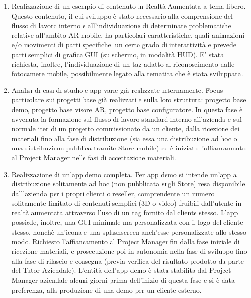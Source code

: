 \begin{enumerate}
	\item	Realizzazione di un esempio di contenuto in Realtà Aumentata a tema libero. Questo contenuto, il cui sviluppo è stato necessario alla comprensione del flusso di lavoro interno e all'individuazione di determinate problematiche relative all’ambito AR mobile, ha particolari caratteristiche, quali animazioni e/o movimenti di parti specifiche, un certo grado di interattività e prevede parti semplici di grafica GUI (su schermo, in modalità HUD). E' stata richiesta, inoltre, l’individuazione di un tag adatto al riconoscimento dalle fotocamere mobile, possibilmente legato alla tematica che \`e stata sviluppata.
	\item	Analisi di casi di studio e app varie già realizzate internamente. Focus particolare sui progetti base già realizzati e sulla loro struttura: progetto base demo, progetto base visore AR, progetto base configuratore. In questa fase \`e avvenuta la formazione sul flusso di lavoro standard interno all’azienda e sul normale iter di un progetto commissionato da un cliente, dalla ricezione dei materiali fino alla fase di distribuzione (sia essa una distribuzione ad hoc o una distribuzione pubblica tramite Store mobile) ed \`e iniziato l'affiancamento al Project Manager nelle fasi di accettazione materiali. 
	\item	Realizzazione di un’app demo completa. Per app demo si intende un’app a distribuzione solitamente ad hoc (non pubblicata sugli Store) resa disponibile dall’azienda per i propri clienti o reseller, comprendente un numero solitamente limitato di contenuti semplici (3D o video) fruibili dall’utente in realtà aumentata attraverso l’uso di un tag fornito dal cliente stesso. L’app possiede, inoltre, una GUI minimale ma personalizzata con il logo del cliente stesso, nonchè un’icona e una splashscreen anch’esse personalizzate allo stesso modo. Richiesto l'affiancamento al Project Manager fin dalla fase iniziale di ricezione materiali, e prosecuzione poi in autonomia nella fase di sviluppo fino alla fase di rilascio e consegna (previa verifica del risultato prodotto da parte del Tutor Aziendale). L’entità dell’app demo \`e stata stabilita dal Project Manager aziendale alcuni giorni prima dell’inizio di questa fase e si \`e data preferenza, alla produzione di una demo per un cliente esterno. 

\end{enumerate}
